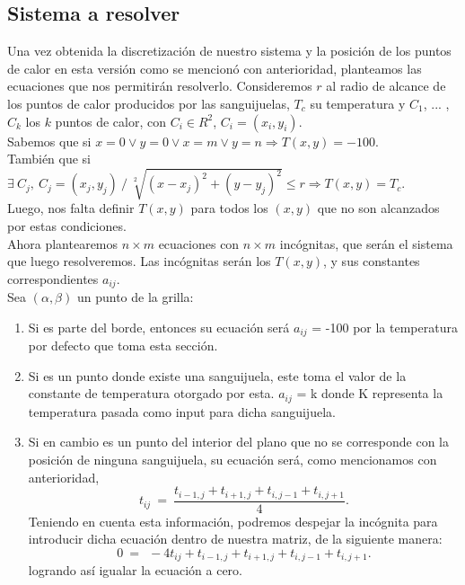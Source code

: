 \subsection{Sistema a resolver}

Una vez obtenida la discretizaci\'on de nuestro sistema y la posici\'on de los puntos de calor en esta versi\'on como se mencion\'o con anterioridad, planteamos las ecuaciones que nos permitir\'an resolverlo. Consideremos $r$ al radio de alcance de los puntos de calor producidos por las sanguijuelas, $T_c$ su temperatura y $C_1$, ... , $C_k$ los $k$ puntos de calor, con $C_i \in R^2$, $C_i = (x_i, y_i)$.\\

Sabemos que si $ x = 0 \vee y = 0 \vee x = m \vee y = n \Rightarrow T(x,y) = -100$. \\
Tambi\'en que si $\exists \: C_j, \: C_j = (x_j, y_j) \: / \: \sqrt[2]{(x-x_j)^2 + (y-y_j)^2} \le r \Rightarrow T(x,y) = T_c$. \\
Luego, nos falta definir $T(x,y)$ para todos los $(x,y)$ que no son alcanzados por estas condiciones.\\
Ahora plantearemos $n \times m$ ecuaciones con $n \times m$ inc\'ognitas, que ser\'an el sistema que luego resolveremos. Las inc\'ognitas ser\'an los $T(x,y)$, y sus constantes correspondientes $a_{ij}$.\\

Sea $(\alpha,\beta)$ un punto de la grilla:
\begin{enumerate}
 \item Si es parte del borde, entonces su ecuaci\'on ser\'a $a_{ij}$ = -100 por la temperatura por defecto que toma esta secci\'on.
 \item Si es un punto donde existe una sanguijuela, este toma el valor de la constante de temperatura otorgado por esta. $a_{ij}$ = k donde K representa la temperatura pasada como input para dicha sanguijuela.
 \item Si en cambio es un punto del interior del plano que no se corresponde con la posici\'on de ninguna sanguijuela, su ecuaci\'on ser\'a, como mencionamos con anterioridad, 
\begin{equation}
t_{ij} \ =\ \frac{ t_{i-1,j} + t_{i+1,j} + t_{i,j-1} + t_{i,j+1}}{4}.
\end{equation}
 Teniendo en cuenta esta informaci\'on, podremos despejar la inc\'ognita para introducir dicha ecuaci\'on dentro de nuestra matriz, de la siguiente manera:
\begin{equation}
0 \ =\ \ -4t_{ij} + t_{i-1,j} + t_{i+1,j} + t_{i,j-1} + t_{i,j+1}.
\end{equation}
logrando as\'i igualar la ecuaci\'on a cero.
\end{enumerate}

